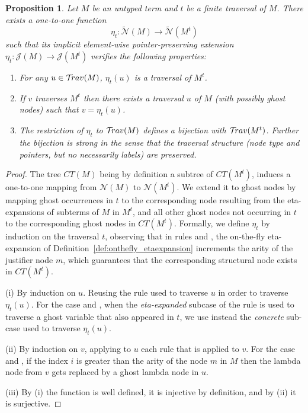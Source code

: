 \documentclass{article}
\theoremstyle{plain}
\newtheorem{proposition}[theorem]{Proposition}
\theoremstyle{definition}
\theoremstyle{remark}
\newcommand\Nodes{\mathcal{N}}%
\newcommand\ExtendedNodes{\tilde{\Nodes}}
\newcommand{\travulc}{\travset}
\newcommand{\ctree}{CT} %
\begin{document}
\begin{proposition}
\label{prop:eta_expanded_trav}
Let $M$ be an untyped term and $t$ be a \emph{finite} traversal of $M$.
There exists a one-to-one function
$$
\eta_t : \ExtendedNodes(M) \longrightarrow \ExtendedNodes(M^t)
$$
such that its implicit \emph{element-wise pointer-preserving} extension $\eta_t : \mathcal{J}(M) \longrightarrow \mathcal{J}(M^t)$ verifies the following properties:
\begin{enumerate}[label=(\roman*)]
    \item For any $u \in \travulc(M)$, $\eta_t(u)$ is a traversal of $M^t$.

    \item If $v$ traverses
    $M^t$ then there exists a traversal $u$ of $M$ (with possibly ghost nodes) such that $v = \eta_t(u)$.

    \item The restriction of $\eta_t$ to $\mathcal{T}\!rav(M)$ defines a bijection with $\mathcal{T}\!rav(M^t)$. Further the bijection is strong in the sense that the traversal structure (node type and pointers, but no necessarily labels) are preserved.
\end{enumerate}
\end{proposition}
\begin{proof}
The tree $\ctree(M)$ being by definition a subtree of $\ctree(M^t)$, induces a one-to-one mapping from $\Nodes(M)$ to $\Nodes(M^t)$.
We extend it to ghost nodes by mapping ghost occurrences in $t$ to the corresponding node resulting from the eta-expansions of subterms of $M$ in $M^t$, and all other ghost nodes not occurring in $t$ to the corresponding ghost nodes in $\ctree(M^t)$. Formally, we define $\eta_t$ by induction on the traversal $t$, observing that in rules  and , the on-the-fly eta-expansion of Definition~\ref{def:onthefly_etaexpansion} increments the arity of the justifier node $m$, which guarantees that the corresponding structural node exists in $\ctree(M^t)$.

(i) By induction on $u$. Reusing the rule used to traverse $u$ in order to traverse $\eta_t(u)$. For the case  and , when the \emph{eta-expanded} subcase of the rule is used to traverse a ghost variable that also appeared in $t$, we use instead the \emph{concrete} sub-case used to traverse $\eta_t(u)$.

(ii) By induction on $v$, applying to $u$ each rule that is applied to $v$. For the case  and , if the index $i$ is greater than the arity of the node $m$ in $M$ then the lambda node from $v$ gets replaced by a ghost lambda node in $u$.

(iii) By (i) the function is well defined, it is injective by definition, and by (ii) it is surjective.
\end{proof}
\end{document}
